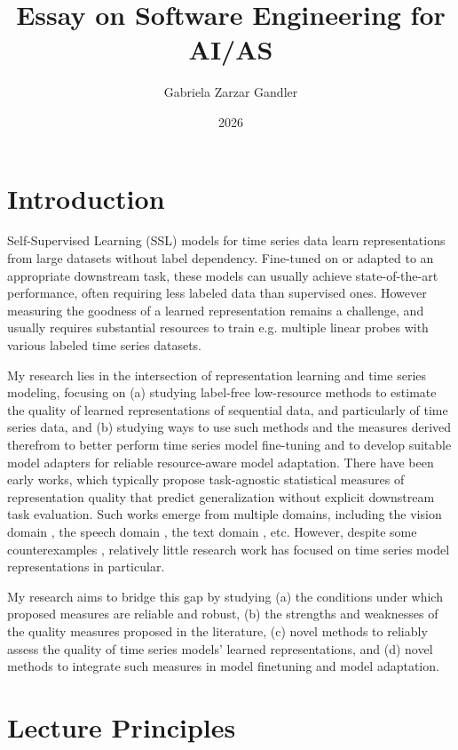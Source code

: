 \documentclass[11pt]{article}
\title{Essay on Software Engineering for AI/AS}
\author{Gabriela Zarzar Gandler}
\date{2026}
\begin{document}
\maketitle
\section{Introduction}

Self-Supervised Learning (SSL) models for time series data learn representations from large datasets without label dependency. Fine-tuned on or adapted to an appropriate downstream task, these models can usually achieve state-of-the-art performance, often requiring less labeled data than supervised ones. However measuring the goodness of a learned representation remains a challenge, and usually requires substantial resources to train e.g. multiple linear probes with various labeled time series datasets.

My research lies in the intersection of representation learning and time series modeling, focusing on (a) studying label-free low-resource methods to estimate the quality of learned representations of sequential data, and particularly of time series data, and (b) studying ways to use such methods and the measures derived therefrom to better perform time series model fine-tuning and to develop suitable model adapters for reliable resource-aware model adaptation. There have been early works, which typically propose task-agnostic statistical measures of representation quality that predict generalization without explicit downstream task evaluation. Such works emerge from multiple domains, including the vision domain \citep{alpha-req, rankme, q-score, tsitsulin23a}, the speech domain \citep{aldeneh25, whetten25, liu24}, the text domain \citep{li25, skean25}, etc. However, despite some counterexamples \citep{shelim25, wen24}, relatively little research work has focused on time series model representations in particular.

My research aims to bridge this gap by studying (a) the conditions under which proposed measures are reliable and robust, (b) the strengths and weaknesses of the quality measures proposed in the literature, (c) novel methods to reliably assess the quality of time series models' learned representations, and (d) novel methods to integrate such measures in model finetuning and model adaptation.

\section{Lecture Principles} \label{ch:lecture}
\end{document}

